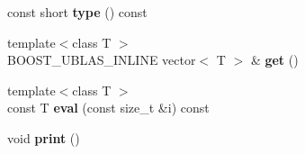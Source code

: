 \begin{DoxyCompactItemize}
\item 
const short {\bfseries type} () const \hypertarget{classboost_1_1numeric_1_1ublas_1_1df__column_a0cc0ab94af87b956eb75ea159ad76ea6}{}\label{classboost_1_1numeric_1_1ublas_1_1df__column_a0cc0ab94af87b956eb75ea159ad76ea6}

\item 
{\footnotesize template$<$class T $>$ }\\B\+O\+O\+S\+T\+\_\+\+U\+B\+L\+A\+S\+\_\+\+I\+N\+L\+I\+NE vector$<$ T $>$ \& {\bfseries get} ()\hypertarget{classboost_1_1numeric_1_1ublas_1_1df__column_a166ffc39d030e2773661bd24f79f66c3}{}\label{classboost_1_1numeric_1_1ublas_1_1df__column_a166ffc39d030e2773661bd24f79f66c3}

\item 
{\footnotesize template$<$class T $>$ }\\const T {\bfseries eval} (const size\+\_\+t \&i) const \hypertarget{classboost_1_1numeric_1_1ublas_1_1df__column_ad0ef5ad76e5ac4b096c70a8c0bd29fbf}{}\label{classboost_1_1numeric_1_1ublas_1_1df__column_ad0ef5ad76e5ac4b096c70a8c0bd29fbf}

\item 
void {\bfseries print} ()\hypertarget{classboost_1_1numeric_1_1ublas_1_1df__column_abacd7ce00ef0a7e3d89e099fefa2ba64}{}\label{classboost_1_1numeric_1_1ublas_1_1df__column_abacd7ce00ef0a7e3d89e099fefa2ba64}

\end{DoxyCompactItemize}
